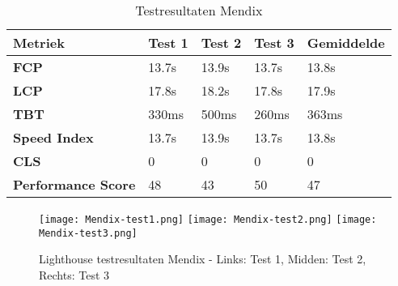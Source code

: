 \begin{table}[h]
    \centering
    \begin{tabular}{ |p{3cm}|p{2.75cm}|p{2.75cm}|p{2.75cm}|p{2.75cm}|}
        \hline
        \textbf{Metriek} & \textbf{Test 1} & \textbf{Test 2}  & \textbf{Test 3} & \textbf{Gemiddelde}\\
        \hline
        \textbf{\gls{FCP}}  & 13.7s & 13.9s & 13.7s & 13.8s \\
        \hline
        \textbf{\gls{LCP}} & 17.8s & 18.2s & 17.8s & 17.9s\\
        \hline
        \textbf{\gls{TBT}}  & 330ms & 500ms & 260ms & 363ms \\
        \hline
        \textbf{Speed Index}  & 13.7s & 13.9s & 13.7s & 13.8s \\
        \hline
        \textbf{\gls{CLS}}  & 0 & 0  & 0 & 0 \\
        \hline
        \textbf{Performance Score}  & 48 & 43  & 50 & 47 \\
        \hline
    \end{tabular}
    \caption[\centering Testresultaten laadtijd Mendix]{\label{tab:Testresultaten Mendix}Testresultaten Mendix}
\end{table}

\begin{figure}[htbp]
    \centering
    \captionsetup{justification=centering}
    \texttt{[image: Mendix-test1.png]}
    \hfill
    \texttt{[image: Mendix-test2.png]}
    \hfill
    \texttt{[image: Mendix-test3.png]}
    \caption{Lighthouse testresultaten Mendix - Links: Test 1, Midden: Test 2, Rechts: Test 3}
    \label{fig:mendix-simple}
\end{figure}
\newpage

